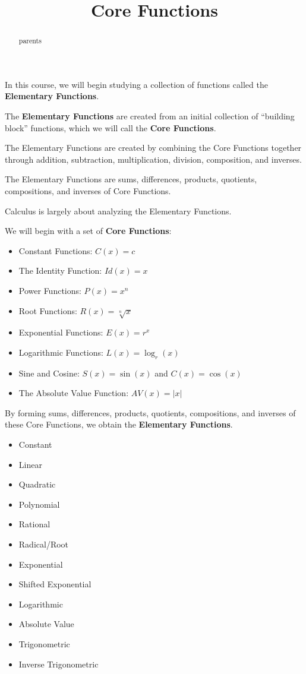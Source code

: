 \documentclass{ximera}
\title{Core Functions}
\begin{document}
\begin{abstract}
parents
\end{abstract}
\maketitle




In this course, we will begin studying a collection of functions called the \textbf{Elementary Functions}.

The \textbf{Elementary Functions} are created from an initial collection of ``building block'' functions, which we will call the \textbf{Core Functions}.

The Elementary Functions are created by combining the Core Functions together through addition, subtraction, multiplication, division, composition, and inverses.


The Elementary Functions are sums, differences, products, quotients, compositions, and inverses of Core Functions.

Calculus is largely about analyzing the Elementary Functions.






We will begin with a set of \textbf{Core Functions}:

\begin{itemize}
\item{Constant Functions: $C(x) = c$}
\item{The Identity Function: $Id(x) = x$}
\item{Power Functions: $P(x) = x^n$}
\item{Root Functions: $R(x) = \sqrt[n]{x}$}
\item{Exponential Functions: $E(x) = r^x$}
\item{Logarithmic Functions: $L(x) = \log_r(x)$}
\item{Sine and Cosine: $S(x) = \sin(x)$ and $C(x) = \cos(x)$}
\item{The Absolute Value Function: $AV(x) = |x|$}
\end{itemize}


By forming sums, differences, products, quotients, compositions, and inverses of these Core Functions, we obtain the \textbf{Elementary Functions}.


\begin{itemize}
\item{Constant}
\item{Linear}
\item{Quadratic}
\item{Polynomial}
\item{Rational}
\item{Radical/Root}
\item{Exponential}
\item{Shifted Exponential}
\item{Logarithmic}
\item{Absolute Value}
\item{Trigonometric}
\item{Inverse Trigonometric}
\end{itemize}
\end{document}

